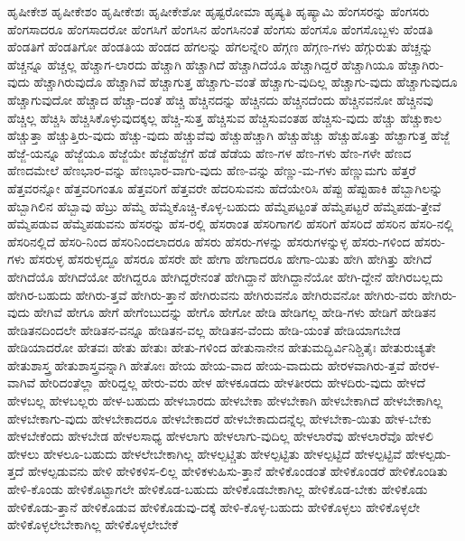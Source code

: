 {ಹೃಷೀಕೇಶ
ಹೃಷೀಕೇಶಂ
ಹೃಷೀಕೇಶಃ
ಹೃಷೀಕೇಶೋ
ಹೃಷ್ಟರೋಮಾ
ಹೃಷ್ಯತಿ
ಹೃಷ್ಯಾಮಿ
ಹೆಂಗಸರನ್ನು
ಹೆಂಗಸರು
ಹೆಂಗಸಾದರೂ
ಹೆಂಗಸಾದರೋ
ಹೆಂಗಸಿಗೆ
ಹೆಂಗಸಿನ
ಹೆಂಗಸಿನಂತೆ
ಹೆಂಗಸು
ಹೆಂಗಸೊ
ಹೆಂಗಸೊಬ್ಬಳು
ಹೆಂಡತಿ
ಹೆಂಡತಿಗೆ
ಹೆಂಡತಿಗೋ
ಹೆಂಡತಿಯ
ಹೆಂಡದ
ಹೆಗಲನ್ನು
ಹೆಗಲನ್ನೇರಿ
ಹೆಗ್ಗಣ
ಹೆಗ್ಗಣ-ಗಳು
ಹೆಗ್ಗುರುತು
ಹೆಚ್ಚನ್ನು
ಹೆಚ್ಚನ್ನೂ
ಹೆಚ್ಚಲ್ಲ
ಹೆಚ್ಚಾಗ-ಲಾರದು
ಹೆಚ್ಚಾಗಿ
ಹೆಚ್ಚಾಗಿದೆ
ಹೆಚ್ಚಾಗಿದೆಯೊ
ಹೆಚ್ಚಾಗಿದ್ದರೆ
ಹೆಚ್ಚಾಗಿಯೂ
ಹೆಚ್ಚಾಗಿರು-ವುದು
ಹೆಚ್ಚಾಗಿರುವುದೊ
ಹೆಚ್ಚಾಗಿವೆ
ಹೆಚ್ಚಾಗುತ್ತ
ಹೆಚ್ಚಾಗು-ವಂತೆ
ಹೆಚ್ಚಾಗು-ವುದಿಲ್ಲ
ಹೆಚ್ಚಾಗು-ವುದು
ಹೆಚ್ಚಾಗುವುದೂ
ಹೆಚ್ಚಾಗುವುದೋ
ಹೆಚ್ಚಾದ
ಹೆಚ್ಚಾ-ದಂತೆ
ಹೆಚ್ಚಿ
ಹೆಚ್ಚಿನದನ್ನು
ಹೆಚ್ಚಿನದು
ಹೆಚ್ಚಿನದೆಂದು
ಹೆಚ್ಚಿನವನೋ
ಹೆಚ್ಚಿನವು
ಹೆಚ್ಚಿಲ್ಲ
ಹೆಚ್ಚಿಸಿ
ಹೆಚ್ಚಿಸಿಕೊಳ್ಳುವುದಕ್ಕಲ್ಲ
ಹೆಚ್ಚಿ-ಸುತ್ತ
ಹೆಚ್ಚಿಸುವ
ಹೆಚ್ಚಿಸುವಂತಹ
ಹೆಚ್ಚಿಸು-ವುದು
ಹೆಚ್ಚು
ಹೆಚ್ಚುಕಾಲ
ಹೆಚ್ಚುತ್ತಾ
ಹೆಚ್ಚುತ್ತಿರು-ವುದು
ಹೆಚ್ಚು-ವುದು
ಹೆಚ್ಚುವೆವು
ಹೆಚ್ಚುಹೆಚ್ಚಾಗಿ
ಹೆಚ್ಚುಹೆಚ್ಚು
ಹೆಚ್ಚುಹೊತ್ತು
ಹೆಚ್ಟಾಗುತ್ತ
ಹೆಜ್ಜೆ
ಹೆಜ್ಜೆ-ಯನ್ನೂ
ಹೆಜ್ಜೆಯೂ
ಹೆಜ್ಜೆಯೇ
ಹೆಜ್ಜೆಹೆಜ್ಜೆಗೆ
ಹೆಡೆ
ಹೆಡೆಯ
ಹೆಣ-ಗಳ
ಹೆಣ-ಗಳು
ಹೆಣ-ಗಳೇ
ಹೆಣದ
ಹೆಣದಮೇಲೆ
ಹೆಣಭಾರ-ವನ್ನು
ಹೆಣಭಾರ-ವಾಗು-ವುದು
ಹೆಣ-ವನ್ನು
ಹೆಣ್ಣು-ಮ-ಗಳು
ಹೆಣ್ಣುಮಗು
ಹೆತ್ತರೆ
ಹೆತ್ತವರನ್ನೋ
ಹೆತ್ತವರಿಗಂತೂ
ಹೆತ್ತವರಿಗೆ
ಹೆತ್ತವರೇ
ಹೆದರಿಸುವನು
ಹೆದೆಯೇರಿಸಿ
ಹೆಪ್ಪು
ಹೆಪ್ಪುಹಾಕಿ
ಹೆಬ್ಬಾಗಿಲನ್ನು
ಹೆಬ್ಬಾಗಿಲಿನ
ಹೆಬ್ಬಾವು
ಹೆಬ್ರು
ಹೆಮ್ಮೆ
ಹೆಮ್ಮೆಕೊಚ್ಚಿ-ಕೊಳ್ಳ-ಬಹುದು
ಹೆಮ್ಮೆಪಟ್ಟಂತೆ
ಹೆಮ್ಮೆಪಟ್ಟರೆ
ಹೆಮ್ಮೆಪಡು-ತ್ತೇವೆ
ಹೆಮ್ಮೆಪಡುವ
ಹೆಮ್ಮೆಪಡುವನು
ಹೆಸರನ್ನು
ಹೆಸ-ರಲ್ಲಿ
ಹೆಸರಾಂತ
ಹೆಸರಿಗಾಗಲಿ
ಹೆಸರಿಗೆ
ಹೆಸರಿದೆ
ಹೆಸರಿನ
ಹೆಸರಿ-ನಲ್ಲಿ
ಹೆಸರಿನಲ್ಲಿದೆ
ಹೆಸರಿ-ನಿಂದ
ಹೆಸರಿನಿಂದಲಾದರೂ
ಹೆಸರು
ಹೆಸರು-ಗಳನ್ನು
ಹೆಸರುಗಳನ್ನುಳ್ಳ
ಹೆಸರು-ಗಳಿಂದ
ಹೆಸರು-ಗಳು
ಹೆಸರುಳ್ಳ
ಹೆಸರುಳ್ಳದ್ದೂ
ಹೆಸರೂ
ಹೆಸರೇ
ಹೇ
ಹೇಗಾ
ಹೇಗಾದರೂ
ಹೇಗಾ-ಯಿತು
ಹೇಗಿ
ಹೇಗಿತ್ತು
ಹೇಗಿದೆ
ಹೇಗಿದೆಯೊ
ಹೇಗಿದೆಯೋ
ಹೇಗಿದ್ದರೂ
ಹೇಗಿದ್ದರೇನಂತೆ
ಹೇಗಿದ್ದಾನೆ
ಹೇಗಿದ್ದಾನೆಯೋ
ಹೇಗಿ-ದ್ದೇನೆ
ಹೇಗಿರಬಲ್ಲದು
ಹೇಗಿರ-ಬಹುದು
ಹೇಗಿರು-ತ್ತವೆ
ಹೇಗಿರು-ತ್ತಾನೆ
ಹೇಗಿರುವನು
ಹೇಗಿರುವನೊ
ಹೇಗಿರುವನೋ
ಹೇಗಿರು-ವರು
ಹೇಗಿರು-ವುದು
ಹೇಗಿವೆ
ಹೇಗೂ
ಹೇಗೆ
ಹೇಗೆಂಬುದನ್ನು
ಹೇಗೊ
ಹೇಗೋ
ಹೇಡಿ
ಹೇಡಿಗಲ್ಲ
ಹೇಡಿ-ಗಳು
ಹೇಡಿಗೆ
ಹೇಡಿತನ
ಹೇಡಿತನದಿಂದಲೇ
ಹೇಡಿತನ-ವನ್ನೂ
ಹೇಡಿತನ-ವಲ್ಲ
ಹೇಡಿತನ-ವೆಂದು
ಹೇಡಿ-ಯಂತೆ
ಹೇಡಿಯಾಗಬೇಡ
ಹೇಡಿಯಾದರೋ
ಹೇತವಃ
ಹೇತು
ಹೇತುಃ
ಹೇತು-ಗಳಿಂದ
ಹೇತುನಾನೇನ
ಹೇತುಮದ್ಭಿರ್ವಿನಿಶ್ಚಿತೈಃ
ಹೇತುರುಚ್ಯತೇ
ಹೇತುಶಾಸ್ತ್ರ
ಹೇತುಶಾಸ್ತ್ರವನ್ನಾಗಿ
ಹೇತೋಃ
ಹೇಯ
ಹೇಯ-ವಾದ
ಹೇಯ-ವಾದುದು
ಹೇರಳವಾಗಿರು-ತ್ತವೆ
ಹೇರಳ-ವಾಗಿವೆ
ಹೇರಿದಂತೆಲ್ಲಾ
ಹೇರಿದ್ದಲ್ಲ
ಹೇರು-ವರು
ಹೇಳ
ಹೇಳಕೂಡದು
ಹೇಳತೀರದು
ಹೇಳದಿರು-ವುದು
ಹೇಳದೆ
ಹೇಳಬಲ್ಲ
ಹೇಳಬಲ್ಲರು
ಹೇಳ-ಬಹುದು
ಹೇಳಬಾರದು
ಹೇಳಬೇಕಾ
ಹೇಳಬೇಕಾಗಿ
ಹೇಳಬೇಕಾಗಿದೆ
ಹೇಳಬೇಕಾಗಿಲ್ಲ
ಹೇಳಬೇಕಾಗು-ವುದು
ಹೇಳಬೇಕಾದರೂ
ಹೇಳಬೇಕಾದರೆ
ಹೇಳಬೇಕಾದುದನ್ನೆಲ್ಲ
ಹೇಳಬೇಕಾ-ಯಿತು
ಹೇಳ-ಬೇಕು
ಹೇಳಬೇಕೆಂದು
ಹೇಳಬೇಡ
ಹೇಳಲಸಾಧ್ಯ
ಹೇಳಲಾಗು
ಹೇಳಲಾಗು-ವುದಿಲ್ಲ
ಹೇಳಲಾರೆವು
ಹೇಳಲಾರೆವೊ
ಹೇಳಲಿ
ಹೇಳಲು
ಹೇಳಲೂ-ಬಹುದು
ಹೇಳಲೇಬೇಕಾಗಿಲ್ಲ
ಹೇಳಲ್ಪಟ್ಚಿತು
ಹೇಳಲ್ಪಟ್ಟಿತು
ಹೇಳಲ್ಪಟ್ಟಿದೆ
ಹೇಳಲ್ಪಟ್ಟಿವೆ
ಹೇಳಲ್ಪಡು-ತ್ತದೆ
ಹೇಳಲ್ಪಡುವನು
ಹೇಳಿ
ಹೇಳಿಕಳಿಸ-ಲಿಲ್ಲ
ಹೇಳಿಕಳುಹಿಸು-ತ್ತಾನೆ
ಹೇಳಿಕೊಂಡಂತೆ
ಹೇಳಿಕೊಂಡರೆ
ಹೇಳಿಕೊಂಡಿತು
ಹೇಳಿ-ಕೊಂಡು
ಹೇಳಿಕೊಟ್ಟಾಗಲೇ
ಹೇಳಿಕೊಡ-ಬಹುದು
ಹೇಳಿಕೊಡಬೇಕಾಗಿಲ್ಲ
ಹೇಳಿಕೊಡ-ಬೇಕು
ಹೇಳಿಕೊಡು
ಹೇಳಿಕೊಡು-ತ್ತಾನೆ
ಹೇಳಿಕೊಡುವ
ಹೇಳಿಕೊಡುವು-ದಕ್ಕೆ
ಹೇಳಿ-ಕೊಳ್ಳ-ಬಹುದು
ಹೇಳಿಕೊಳ್ಳಲು
ಹೇಳಿಕೊಳ್ಳಲೇ
ಹೇಳಿಕೊಳ್ಳಲೇಬೇಕಾಗಿಲ್ಲ
ಹೇಳಿಕೊಳ್ಳಲೇಬೇಕೆ
}
